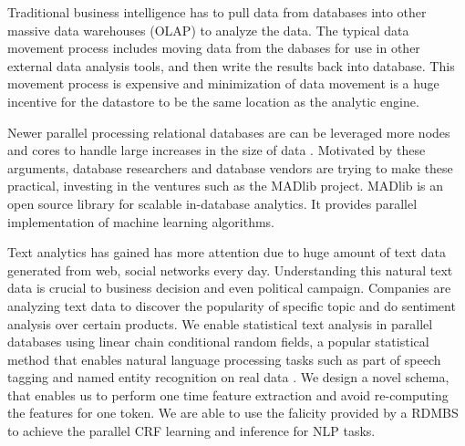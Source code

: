 \documentclass[11pt,letterpaper]{article}
\begin{document}
Traditional business intelligence has to pull data from databases into other massive 
data warehouses (OLAP) to analyze the data. 
The typical data movement process includes moving data from the dabases for use in other external 
data analysis tools, and then write the results back into database.
This movement process is expensive and minimization of data movement is a huge incentive for the datastore 
to be the same location as the analytic engine.

Newer parallel processing relational databases are can be leveraged more nodes and cores to handle large
increases in the size of data \cite{DeWitt:1992:PDS:129888.129894}. 
Motivated by these arguments, database researchers and database vendors are trying to make these practical,
investing in the ventures such as the MADlib project. 
MADlib is an open source library for scalable in-database analytics.
It provides parallel implementation of machine learning algorithms.

Text analytics has gained has more attention due to huge amount of text data generated from web, 
social networks every day.
Understanding this natural text data is crucial to business decision and even political campaign. 
Companies are analyzing text data to discover the popularity of specific topic and do sentiment analysis over certain products.
We enable statistical text analysis in parallel databases using linear chain conditional random fields, a
popular statistical method that enables
natural language processing tasks such as part of speech tagging and named entity recognition on
real data \cite{DBLP:conf/icml/LaffertyMP01}.
We design a novel schema, that enables us to 
perform one time feature extraction and avoid re-computing the features for one token. 
We are able to use the falicity provided by a RDMBS to achieve the parallel CRF learning and inference for NLP tasks.
\end{document}
